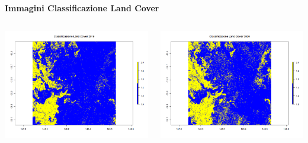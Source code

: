 \documentclass{beamer}
\begin{document}
\begin{frame}{\textbf{Immagini Classificazione Land Cover}}
\begin{columns}
    \centering
    \includegraphics[width=\textwidth]{Land_Cover_2019.png}
    
    \centering
    \includegraphics[width=\textwidth]{Land_Cover_2020.png}
    

\end{columns}
\end{frame}
\end{document}
